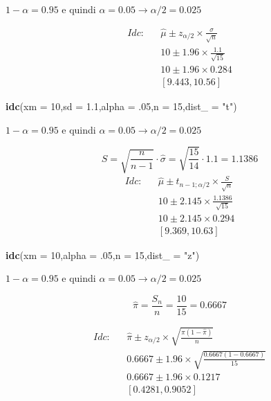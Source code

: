 \documentclass[
  11pt,
]{book}
\newenvironment{Shaded}{\begin{snugshade}}{\end{snugshade}}
\newcommand{\AttributeTok}[1]{\textcolor[rgb]{0.13,0.29,0.53}{#1}}
\newcommand{\DecValTok}[1]{\textcolor[rgb]{0.00,0.00,0.81}{#1}}
\newcommand{\FloatTok}[1]{\textcolor[rgb]{0.00,0.00,0.81}{#1}}
\newcommand{\FunctionTok}[1]{\textcolor[rgb]{0.13,0.29,0.53}{\textbf{#1}}}
\newcommand{\NormalTok}[1]{#1}
\newcommand{\StringTok}[1]{\textcolor[rgb]{0.31,0.60,0.02}{#1}}
\theoremstyle{mytheoremstyle}
\theoremstyle{mydefstyle}
\begin{document}
\(1-\alpha =0.95\) e quindi \(\alpha=0.05\rightarrow \alpha/2=0.025\)

\begin{eqnarray*}
  Idc: & &  \hat\mu \pm  z_{\alpha/2} \times \frac{ \sigma }{\sqrt{n}} \\
     & &  10 \pm  1.96 \times \frac{ 1.1 }{\sqrt{ 15 }} \\
     & &  10 \pm  1.96 \times  0.284 \\
     & & [ 9.443 ,  10.56 ]
\end{eqnarray*}

\begin{Shaded}
\begin{Highlighting}[]
\FunctionTok{idc}\NormalTok{(}\AttributeTok{xm =} \DecValTok{10}\NormalTok{,}\AttributeTok{sd =} \FloatTok{1.1}\NormalTok{,}\AttributeTok{alpha =}\NormalTok{ .}\DecValTok{05}\NormalTok{,}\AttributeTok{n =} \DecValTok{15}\NormalTok{,}\AttributeTok{dist\_ =} \StringTok{"t"}\NormalTok{)}
\end{Highlighting}
\end{Shaded}

\(1-\alpha =0.95\) e quindi \(\alpha=0.05\rightarrow \alpha/2=0.025\)

\[
      S  =\sqrt{\frac {n}{n-1}}\cdot\hat\sigma =
     \sqrt{\frac { 15 }{ 14 }}\cdot 1.1 = 1.1386 
\]
\begin{eqnarray*}
  Idc: & &  \hat\mu \pm  t_{n-1;\alpha/2} \times \frac{S}{\sqrt{n}} \\
     & &  10 \pm  2.145 \times \frac{ 1.1386 }{\sqrt{ 15 }} \\
     & &  10 \pm  2.145 \times  0.294 \\
     & & [ 9.369 ,  10.63 ]
\end{eqnarray*}

\begin{Shaded}
\begin{Highlighting}[]
\FunctionTok{idc}\NormalTok{(}\AttributeTok{xm =} \DecValTok{10}\NormalTok{,}\AttributeTok{alpha =}\NormalTok{ .}\DecValTok{05}\NormalTok{,}\AttributeTok{n =} \DecValTok{15}\NormalTok{,}\AttributeTok{dist\_ =} \StringTok{"z"}\NormalTok{)}
\end{Highlighting}
\end{Shaded}

\(1-\alpha =0.95\) e quindi \(\alpha=0.05\rightarrow \alpha/2=0.025\)

\[
  \hat\pi = \frac{S_n}n = \frac{ 10 }{ 15 }= 0.6667 
\]

\begin{eqnarray*}
  Idc: & &  \hat\pi \pm  z_{\alpha/2} \times \sqrt{\frac{\hat\pi(1-\hat\pi)}{n}} \\
     & &  0.6667 \pm  1.96 \times \sqrt{\frac{ 0.6667 (1- 0.6667 )}{ 15 }} \\
     & &  0.6667 \pm  1.96 \times  0.1217 \\
     & & [ 0.4281 ,  0.9052 ]
\end{eqnarray*}
\end{document}
